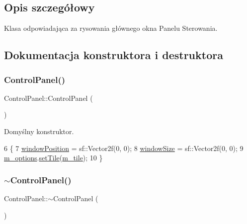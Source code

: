 \subsection{Opis szczegółowy}
Klasa odpowiadająca za rysowania głównego okna Panelu Sterowania. 

\subsection{Dokumentacja konstruktora i destruktora}
\mbox{\label{class_control_panel_ae9a88e3d1edf51b1b3dad989d2ce7140}} 
\subsubsection{\texorpdfstring{Control\+Panel()}{ControlPanel()}}
{\footnotesize\ttfamily Control\+Panel\+::\+Control\+Panel (\begin{DoxyParamCaption}{ }\end{DoxyParamCaption})}

Domyślny konstruktor. 
\begin{DoxyCode}
6 \{
7     \mbox{\hyperlink{class_control_panel_afef4fad7217719a2dc9df005a40efda0}{windowPosition}} = sf::Vector2f(0, 0);
8     \mbox{\hyperlink{class_control_panel_ac270884ed654aa0c068d551b4653e39c}{windowSize}} = sf::Vector2f(0, 0);
9     \mbox{\hyperlink{class_control_panel_a662113a86b5fa2be4790dd5b403e3f70}{m\_options}}.\mbox{\hyperlink{class_options_a7304b6cb34a2f1bbc5aac543778f1de9}{setTile}}(\mbox{\hyperlink{class_control_panel_a9515f025047a35dba24b6ac94c7a55bd}{m\_tile}});
10 \}
\end{DoxyCode}
\mbox{\label{class_control_panel_aaa18bb1c97830df080f39d8abb2d1bd5}} 
\subsubsection{\texorpdfstring{$\sim$\+Control\+Panel()}{~ControlPanel()}}
{\footnotesize\ttfamily Control\+Panel\+::$\sim$\+Control\+Panel (\begin{DoxyParamCaption}{ }\end{DoxyParamCaption})}

